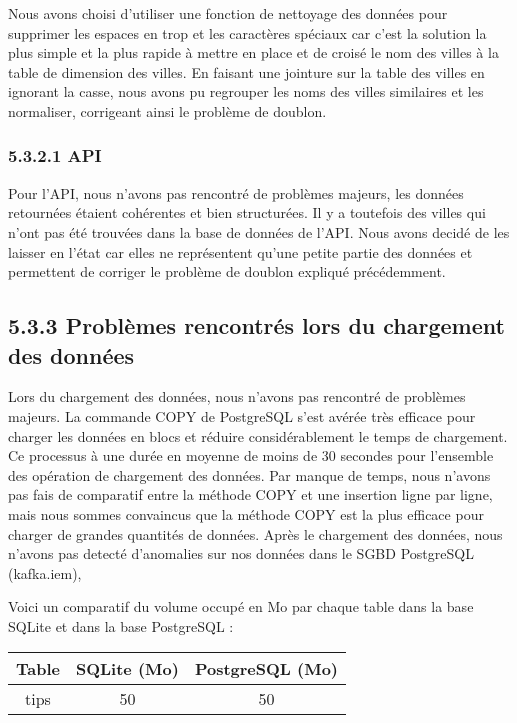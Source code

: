 \begin{itemize}
Nous avons choisi d'utiliser une fonction de nettoyage des données pour supprimer les espaces en trop et les caractères spéciaux car c'est la solution la plus simple et la plus rapide à mettre en place et de croisé le nom des villes à la table de dimension des villes.
En faisant une jointure sur la table des villes en ignorant la casse, nous avons pu regrouper les noms des villes similaires et les normaliser, corrigeant ainsi le problème de doublon.

\subsubsection{5.3.2.1 API}

Pour l'API, nous n'avons pas rencontré de problèmes majeurs, les données retournées étaient cohérentes et bien structurées.
Il y a toutefois des villes qui n'ont pas été trouvées dans la base de données de l'API.
Nous avons decidé de les laisser en l'état car elles ne représentent qu'une petite partie des données et permettent de corriger le problème de doublon expliqué précédemment.


\subsection{5.3.3 Problèmes rencontrés lors du chargement des données}

Lors du chargement des données, nous n'avons pas rencontré de problèmes majeurs.
La commande COPY de PostgreSQL s'est avérée très efficace pour charger les données en blocs et réduire considérablement le temps de chargement.
Ce processus à une durée en moyenne de moins de 30 secondes pour l'ensemble des opération de chargement des données.
Par manque de temps, nous n'avons pas fais de comparatif entre la méthode COPY et une insertion ligne par ligne, mais nous sommes convaincus que la méthode COPY est la plus efficace pour charger de grandes quantités de données.
Après le chargement des données, nous n'avons pas detecté d'anomalies sur nos données dans le SGBD PostgreSQL (kafka.iem),

Voici un comparatif du volume occupé en Mo par chaque table dans la base SQLite et dans la base PostgreSQL :

\begin{center}
\begin{tabular}{|c|c|c|}
\hline
Table & SQLite (Mo) & PostgreSQL (Mo) \\
\hline
tips & 50 & 50 \\
\hline
\end{tabular}
\end{center}


\end{itemize}

